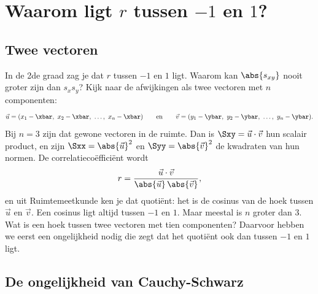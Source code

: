 
\begin{oefeningen}
\end{oefeningen}

\section{Waarom ligt $r$ tussen $-1$ en $1$?}

\subsection{Twee vectoren}

In de 2de graad zag je dat $r$ tussen $-1$ en $1$ ligt. Waarom kan $\abs{s_{xy}}$ nooit groter zijn dan $s_x s_y$? Kijk naar de afwijkingen als twee vectoren met $n$ componenten:
\[ \vec u = (x_1 - \xbar,\ x_2 - \xbar,\ \ldots,\ x_n - \xbar) \qquad\text{en}\qquad \vec v = (y_1 - \ybar,\ y_2 - \ybar,\ \ldots,\ y_n - \ybar) . \]
Bij $n = 3$ zijn dat gewone vectoren in de ruimte. Dan is $\Sxy = \vec u \cdot \vec v$ hun scalair product, en zijn $\Sxx = \abs{\vec u}^2$ en $\Syy = \abs{\vec v}^2$ de kwadraten van hun normen. De correlatiecoëfficiënt wordt
\[ r = \frac{\vec u \cdot \vec v}{\abs{\vec u}\,\abs{\vec v}} , \]
en uit Ruimtemeetkunde ken je dat quotiënt: het is de cosinus van de hoek tussen $\vec u$ en $\vec v$. Een cosinus ligt altijd tussen $-1$ en $1$. Maar meestal is $n$ groter dan 3. Wat is een hoek tussen twee vectoren met tien componenten? Daarvoor hebben we eerst een ongelijkheid nodig die zegt dat het quotiënt ook dan tussen $-1$ en $1$ ligt.

\subsection{De ongelijkheid van Cauchy-Schwarz}

